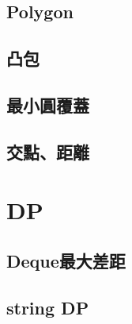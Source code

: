     \subsection{Polygon}
        \subsection{凸包}
        
        \subsection{最小圓覆蓋}
        
        \subsection{交點、距離}
            

\section{DP}
    \subsection{Deque最大差距}
    \subsection{string DP}
        
